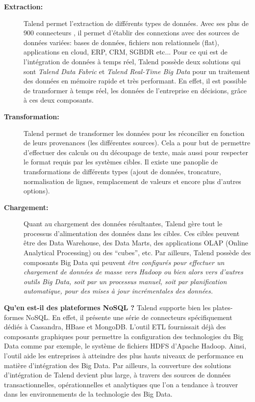 \documentclass[12pt,a4wide,twoside]{report}
\begin{document}
\begin{description}
	\item[\textbf{Extraction:}] 
		Talend permet l'extraction de différents types de données. Avec ses plus de 900 connecteurs \cite{connect}, il permet d'établir des connexions avec des sources de données variées: bases de données, fichiers non relationnels (flat), applications en cloud, ERP, CRM, SGBDR etc...\newline 
Pour ce qui est de l'intégration de données à temps réel, Talend possède deux solutions qui sont \emph{Talend Data Fabric} et \emph{Talend Real-Time Big Data} pour un traitement des données en mémoire rapide et très performant. En effet, il est possible de transformer à temps réel, les données de l'entreprise en décisions, grâce à ces deux composants.
	\item[\textbf{Transformation:}] 
	Talend permet de transformer les données pour les réconcilier en fonction de leurs provenances (les différentes sources). Cela a pour but de permettre d'effectuer des calculs ou du découpage de texte, mais aussi pour respecter le format requis par les systèmes cibles. Il existe une panoplie de transformations de différents types (ajout de données, troncature, normalisation de lignes, remplacement de valeurs et encore plus d'autres options).
	\item[\textbf{Chargement:}]
	Quant au chargement des données résultantes, Talend gère tout le processus d'alimentation des données dans les cibles. Ces cibles peuvent être des Data Warehouse, des Data Marts, des applications OLAP (Online Analytical Processing) ou des “cubes”, etc.\newline
	Par ailleurs, Talend possède des composants Big Data qui peuvent \emph{être configurés pour effectuer un chargement de données de masse vers Hadoop ou bien alors vers d’autres outils Big Data, soit par un processus manuel, soit par planification automatique, pour des mises à jour incrémentales des données.}\cite{chargTalend}
\end{description}

\textbf{Qu'en est-il des plateformes NoSQL ?} \newline
		Talend supporte bien les plates-formes NoSQL. En effet, il présente une série de connecteurs spécifiquement dédiés à Cassandra, HBase et MongoDB. \cite{ref4}\newline
		L'outil ETL fournissait déjà des composants graphiques pour permettre la configuration des technologies du Big Data comme par exemple, le système de fichiers HDFS d’Apache Hadoop.\newline
		Ainsi, l'outil aide les entreprises à atteindre des plus hauts niveaux de performance en matière d’intégration des Big Data. Par ailleurs, la couverture des solutions d'intégration de Talend devient plus large, à travers des sources de données transactionnelles, opérationnelles et analytiques que l’on a tendance à trouver dans les environnements de la technologie des Big Data.
		
\end{document}
